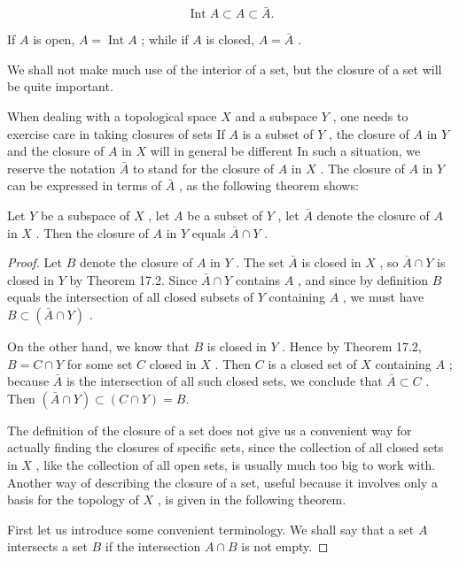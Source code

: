 \[
\operatorname{Int}A \subset  A \subset  \bar{A}.
\]

If \(A\) is open, \(A = \operatorname{Int}A\) ; while if \(A\) is closed, \(A = \bar{A}\) .

We shall not make much use of the interior of a set, but the closure of a set will be quite important.

When dealing with a topological space \(X\) and a subspace \(Y\) , one needs to exercise care in taking closures of sets If \(A\) is a subset of \(Y\) , the closure of \(A\) in \(Y\) and the closure of \(A\) in \(X\) will in general be different In such a situation, we reserve the notation \(\bar{A}\) to stand for the closure of \(A\) in \(X\) . The closure of \(A\) in \(Y\) can be expressed in terms of \(\bar{A}\) , as the following theorem shows:

\begin{theorem} Let \(Y\) be a subspace of \(X\) , let \(A\) be a subset of \(Y\) , let \(\bar{A}\) denote the closure of \(A\) in \(X\) . Then the closure of \(A\) in \(Y\) equals \(\bar{A} \cap  Y\) .

\end{theorem}
\begin{proof}
Let \(B\) denote the closure of \(A\) in \(Y\) . The set \(\bar{A}\) is closed in \(X\) , so \(\bar{A} \cap  Y\) is closed in \(Y\) by Theorem 17.2. Since \(\bar{A} \cap  Y\) contains \(A\) , and since by definition \(B\) equals the intersection of all closed subsets of \(Y\) containing \(A\) , we must have \(B \subset  \left( {\bar{A} \cap  Y}\right)\) .

On the other hand, we know that \(B\) is closed in \(Y\) . Hence by Theorem 17.2, \(B = C \cap  Y\) for some set \(C\) closed in \(X\) . Then \(C\) is a closed set of \(X\) containing \(A\) ; because \(\bar{A}\) is the intersection of all such closed sets, we conclude that \(\bar{A} \subset  C\) . Then \(\left( {\bar{A} \cap  Y}\right)  \subset  \left( {C \cap  Y}\right)  = B.\)

The definition of the closure of a set does not give us a convenient way for actually finding the closures of specific sets, since the collection of all closed sets in \(X\) , like the collection of all open sets, is usually much too big to work with. Another way of describing the closure of a set, useful because it involves only a basis for the topology of \(X\) , is given in the following theorem.

First let us introduce some convenient terminology. We shall say that a set \(A\) intersects a set \(B\) if the intersection \(A \cap  B\) is not empty.
\end{proof}

